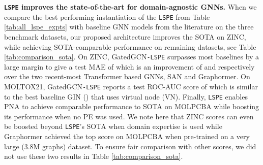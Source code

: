 \documentclass{article} \usepackage{iclr2021_conference,times}
\begin{document}
{\bf \texttt{LSPE} improves the state-of-the-art for domain-agnostic GNNs.} When we compare the best performing instantiation of the \texttt{LSPE} from Table \ref{tab:all_lspe_expts} with baseline GNN models from the literature on the three benchmark datasets, our proposed architecture improves the SOTA on 
ZINC,
while achieving SOTA-comparable performance on 
remaining datasets,
see Table \ref{tab:comparison_sota}. On ZINC, GatedGCN\texttt{-LSPE} surpasses most baselines by a large margin to give a test MAE of 
which is an improvement of 
 and 
respectively over the two recent-most Transformer based GNNs, SAN and Graphormer. On MOLTOX21, GatedGCN\texttt{-LSPE} reports a test ROC-AUC score of  which is similar to the best baseline GIN () that uses virtual node (VN). Finally, \texttt{LSPE} enables PNA to achieve comparable performance to SOTA on MOLPCBA while boosting its performance when no PE was used. We note here that ZINC scores can even be boosted beyond \texttt{LSPE}'s SOTA when domain expertise is used \citep{bouritsas2020improving, bodnar2021weisfeiler} while Graphormer \citep{ying2021transformers} achieved the top score on MOLPCBA when pre-trained on a very large (3.8M graphs) 
dataset. To ensure fair comparison with other scores, we did not use these two results in Table \ref{tab:comparison_sota}.
\end{document}
